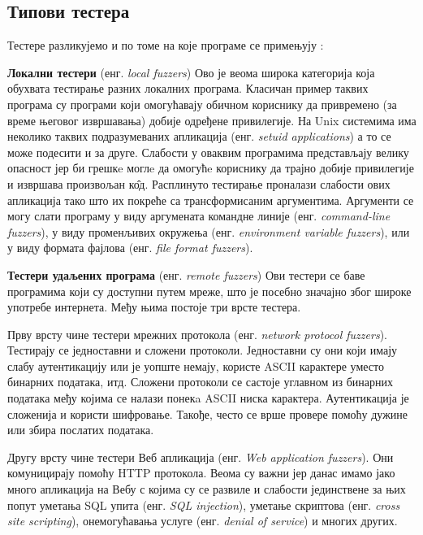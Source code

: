 \documentclass[12pt,oneside]{memoir}
\begin{document}
\subsection{Типови тестера}
\label{subsec:tipovi}

Тестере разликујемо и по томе на које програме се примењују \cite{fuzzingBrute, fuzzing}:
\begin{description}
\item \textbf{Локални тестери} (енг. \textit{local fuzzers}) Ово је веома широка категорија која обухвата тестирање разних локалних програма. Класичан пример таквих програма су програми који омогућавају обичном кориснику да привремено (за време његовог извршавања) добије одређене привилегије. На Unix системима има неколико таквих подразумеваних апликација (енг. \textit{setuid applications}) а то се може подесити и за друге. Слабости у оваквим програмима представљају велику опасност јер би грешкe моглe да омогућe кориснику да трајно добије привилегије и извршава произвољан к\^{о}д. Расплинуто тестирање проналази слабости ових апликација тако што их покреће са трансформисаним аргументима. Аргументи се могу слати програму у виду аргумената командне линије (енг. \textit{command-line fuzzers}), у виду променљивих окружења (енг. \textit{environment variable fuzzers}), или у виду формата фајлова (енг. \textit{file format fuzzers}).
\item \textbf{Тестери удаљених програма} (енг. \textit{remote fuzzers}) Ови тестери се баве програмима који су доступни путем мреже, што је посебно значајно због широке употребе интернета. Међу њима постоје три врсте тестера. 

Прву врсту чине тестери мрежних протокола (енг. \textit{network protocol fuzzers}). Тестирају се једноставни и сложени протоколи. Једноставни су они који имају слабу аутентикацију или је уопште немају, користе ASCII карактере уместо бинарних података, итд. Сложени протоколи се састоје углавном из бинарних података међу којима се налази понекa ASCII ниска карактера. Аутентикација је сложенија и користи шифровање. Такође, често се врше провере помоћу дужине или збира послатих података.  

Другу врсту чине тестери Веб апликација (енг. \textit{Web application fuzzers}). Они комуницирају помоћу HTTP протокола. Веома су важни јер данас имамо јако много апликација на Вебу с којима су се развиле и слабости јединствене за њих попут уметања SQL упита (енг. \textit{SQL injection}), уметање скриптова (енг. \textit{cross site scripting}), онемогућавања услуге (енг. \textit{denial of service}) и многих других.


\end{description}
\end{document}
